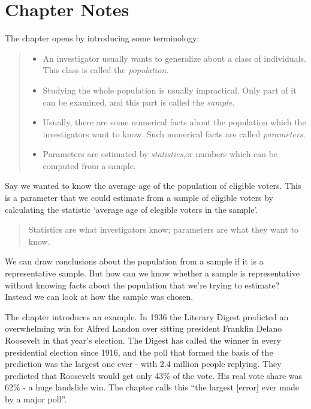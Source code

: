 \documentclass[
]{book}
\providecommand{\tightlist}{%
  \setlength{\itemsep}{0pt}\setlength{\parskip}{0pt}}
\begin{document}
\hypertarget{chapter-notes-18}{%
\section{Chapter Notes}\label{chapter-notes-18}}

The chapter opens by introducing some terminology:

\begin{quote}
\begin{itemize}
\tightlist
\item
  An investigator usually wants to generalize about a class of individuals. This class is called the \emph{population.}
\item
  Studying the whole population is usually impractical. Only part of it can be examined, and this part is called the \emph{sample.}
\item
  Usually, there are some numerical facts about the population which the investigators want to know. Such numerical facts are called \emph{parameters.}
\item
  Parameters are estimated by \emph{statistics},or numbers which can be computed from a sample.
\end{itemize}
\end{quote}

Say we wanted to know the average age of the population of eligible voters. This is a parameter that we could estimate from a sample of eligible voters by calculating the statistic `average age of elegible voters in the sample'.

\begin{quote}
Statistics are what investigators know; parameters are what they want to know.
\end{quote}

We can draw conclusions about the population from a sample if it is a representative sample. But how can we know whether a sample is representative without knowing facts about the population that we're trying to estimate? Instead we can look at how the sample was chosen.

The chapter introduces an example. In 1936 the Literary Digest predicted an overwhelming win for Alfred Landon over sitting president Franklin Delano Roosevelt in that year's election. The Digest has called the winner in every presidential election since 1916, and the poll that formed the basis of the prediction was the largest one ever - with 2.4 million people replying. They predicted that Roosevelt would get only 43\% of the vote. His real vote share was 62\% - a huge landslide win. The chapter calls this ``the largest {[}error{]} ever made by a major poll''.
\end{document}
